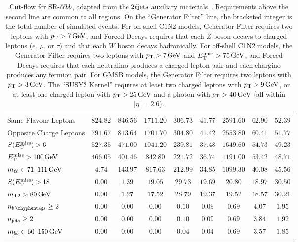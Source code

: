 \begin{sidewaystable}[tp]
{\begin{tabular}{lcccccccc}
Same Flavour Leptons                                       & $824.82$ & $846.56$ & $1711.20$ & $306.73$ & $41.77$ & $2591.60$ & $62.90$ & $52.39$ \\
Opposite Charge Leptons                                   & $791.67$ & $813.64$ & $1701.70$ & $304.80$ & $41.42$ & $2553.80$ & $60.41$ & $51.77$ \\
$\metsig > 6$                                               & $527.35$ & $471.00$ & $1041.20$ & $239.81$ & $37.48$ & $1649.60$ & $54.73$ & $49.23$ \\
$\met > 100\,\eV[G]$                                           & $466.05$ & $401.46$ & $842.80$ & $221.72$ & $36.74$ & $1191.00$ & $53.42$ & $48.71$ \\
\hline
$\mll \in 71\textrm{--}111\,\eV[G]$                            & $4.74$ & $143.97$ & $817.63$ & $212.99$ & $34.85$ & $1099.30$ & $40.08$ & $45.56$ \\
$\metsig > 18$                                            & $0.00$ & $1.39$ & $19.05$ & $29.73$ & $19.69$ & $20.80$ & $18.97$ & $30.50$ \\
$\mttwo > 80\,\eV[G]$                                        & $0.00$ & $1.27$ & $17.52$ & $28.79$ & $19.37$ & $19.52$ & $18.57$ & $30.21$ \\
$\nbtag \geq 2$                                          & $0.00$ & $0.00$ & $0.00$ & $0.10$ & $0.09$ & $0.69$ & $4.07$ & $1.95$ \\
$\njet \geq 2$                               & $0.00$ & $0.00$ & $0.00$ & $0.10$ & $0.09$ & $0.69$ & $3.84$ & $1.92$ \\
$\mbb \in 60\text{--}150\,\eV[G]$                            & $0.00$ & $0.00$ & $0.00$ & $0.04$ & $0.04$ & $0.69$ & $3.57$ & $1.85$ \\
\end{tabular}
}
\caption[
Cut-flow for SR-$\llbb$
]{%
Cut-flow for SR-$\llbb$,
adapted from the $\twoljets$ auxiliary materials~\cite{hepdata.116034}.
Requirements above the second line are common to all regions.
On the ``Generator Filter'' line, the bracketed integer is the total number of
simulated events.
For on-shell C1N2 models, Generator Filter requires
two leptons with $\pt > 7\,\eV[G]$, and
Forced Decays requires
that each $Z$ boson decays to charged leptons ($e$, $\mu$, or $\tau$)
and that each $W$ boson decays hadronically.
For off-shell C1N2 models, the Generator Filter requires
two leptons with $\pt > 7\,\eV[G]$ and $\met > 75\,\eV[G]$, and
Forced Decays requires
that each neutralino produces a charged lepton pair and each chargino produces
any fermion pair.
For GMSB models, the Generator Filter requires
two leptons with $\pt > 3\,\eV[G]$.
The ``SUSY2 Kernel'' requires at least two charged leptons with
$\pt > 9\,\eV[G]$, or at least one charged lepton with
$\pt > 25\,\eV[G]$ and a photon with $\pt > 40\,\eV[G]$
(all within $|\eta|=2.6$).
}
\label{aux:ewk:cutflowSRllbb}
\end{sidewaystable}

